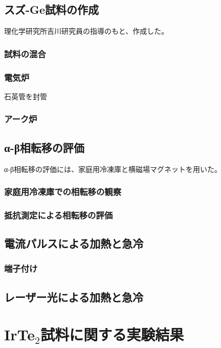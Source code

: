 \documentclass[11pt,a4paper]{jsarticle}
\begin{document}
\subsection{スズ-Ge試料の作成}
理化学研究所吉川研究員の指導のもと、作成した。%

\subsubsection{試料の混合}

\subsubsection{電気炉}
石英管を封管

\subsubsection{アーク炉}

\subsection{α-β相転移の評価}
α-β相転移の評価には、家庭用冷凍庫と横磁場マグネットを用いた。

\subsubsection{家庭用冷凍庫での相転移の観察}

\subsubsection{抵抗測定による相転移の評価}

\subsection{電流パルスによる加熱と急冷}

\subsubsection{端子付け}

\subsection{レーザー光による加熱と急冷}


\section{IrTe$_2$試料に関する実験結果}
\end{document}

